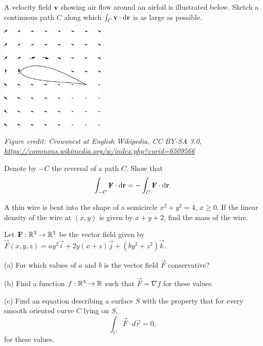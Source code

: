 \documentclass[svgnames]{watsonbook}
\begin{document}
\begin{aexercise}
  A velocity field $\mathbf{v}$ showing air flow around an airfoil is
  illustrated below. Sketch a continuous path $C$ along which
  $\int_C \mathbf{v} \cdot \mathrm{d}\mathbf{r}$ is as large as possible. 
  \begin{center}
    \includegraphics[width=5cm]{exercisefigures/airfoil}
  \end{center}
\textit{\tiny Figure credit: Crowsnest at English Wikipedia, CC BY-SA 3.0, \url{https://commons.wikimedia.org/w/index.php?curid=6509566}}
\end{aexercise}

\begin{aexercise}
  Denote by $-C$ the reversal of a path $C$. Show that 
  \[
  \int_{-C} \mathbf{F} \cdot \mathrm{d}\mathbf{r} = -\int_{C}\mathbf{F}
  \cdot \mathrm{d}\mathbf{r}. 
  \]
\end{aexercise}


\begin{aexercise}
  A thin wire is bent into the shape of a semicircle $x^2 + y^2 = 4$,
  $x \geq 0$. If the linear density of the wire at $(x,y)$ is given by
  $x+y+2$, find the mass of the wire. 
\end{aexercise}

\begin{aexercise}
  Let $\mathbf{F}:\mathbb{R}^3 \to \mathbb{R}^3$ be the vector field given by
  $\vec{F}(x,y,z)=ay^2\vec{i}+2y(x+z)\vec{j}+(by^2 +z^2)\vec{k}$.

  (a) For which values of $a$ and $b$ is the vector field $\vec{F}$
  conservative?

  (b) Find a function $f:\mathbb{R}^3 \to \mathbb{R}$ such that $\vec{F} = \nabla f$
  for these values.

  (c) Find an equation describing a surface $S$ with the property that
  for every smooth oriented curve $C$ lying on $S$,
  \[
    \int_C \vec{F}\cdot d\vec{r} = 0,
  \]
  for these values.
\end{aexercise}
\end{document}
